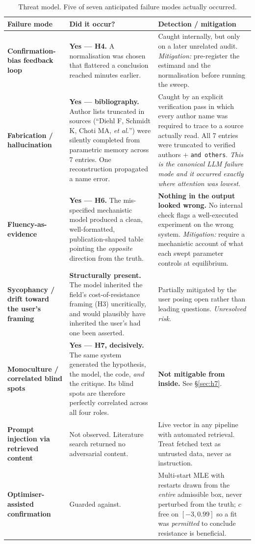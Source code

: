 \documentclass[11pt,a4paper]{article}
\begin{document}
\begin{table}[h]
\centering
\small
\begin{tabular}{p{3.5cm}p{4.6cm}p{5.6cm}}
\toprule
\textbf{Failure mode} & \textbf{Did it occur?} & \textbf{Detection / mitigation}\\
\midrule
\textbf{Confirmation-bias feedback loop} & \textbf{Yes --- H4.} A normalisation was chosen that flattered a conclusion reached minutes earlier. & Caught internally, but only on a later unrelated audit. \emph{Mitigation:} pre-register the estimand and the normalisation before running the sweep.\\
\addlinespace
\textbf{Fabrication / hallucination} & \textbf{Yes --- bibliography.} Author lists truncated in sources (``Diehl F, Schmidt K, Choti MA, \emph{et al.}'') were silently completed from parametric memory across 7 entries. One reconstruction propagated a name error. & Caught by an explicit verification pass in which every author name was required to trace to a source actually read. All 7 entries were truncated to verified authors $+$ \texttt{and others}. \emph{This is the canonical LLM failure mode and it occurred exactly where attention was lowest.}\\
\addlinespace
\textbf{Fluency-as-evidence} & \textbf{Yes --- H6.} The mis-specified mechanistic model produced a clean, well-formatted, publication-shaped table pointing the \emph{opposite} direction from the truth. & \textbf{Nothing in the output looked wrong.} No internal check flags a well-executed experiment on the wrong system. \emph{Mitigation:} require a mechanistic account of what each swept parameter controls at equilibrium.\\
\addlinespace
\textbf{Sycophancy / drift toward the user's framing} & \textbf{Structurally present.} The model inherited the field's cost-of-resistance framing (H3) uncritically, and would plausibly have inherited the user's had one been asserted. & Partially mitigated by the user posing open rather than leading questions. \emph{Unresolved risk.}\\
\addlinespace
\textbf{Monoculture / correlated blind spots} & \textbf{Yes --- H7, decisively.} The same system generated the hypothesis, the model, the code, \emph{and} the critique. Its blind spots are therefore perfectly correlated across all four roles. & \textbf{Not mitigable from inside.} See \S\ref{sec:h7}.\\
\addlinespace
\textbf{Prompt injection via retrieved content} & Not observed. Literature search returned no adversarial content. & Live vector in any pipeline with automated retrieval. Treat fetched text as untrusted data, never as instruction.\\
\addlinespace
\textbf{Optimiser-assisted confirmation} & Guarded against. & Multi-start MLE with restarts drawn from the \emph{entire} admissible box, never perturbed from the truth; $c$ free on $[-3, 0.99]$ so a fit was \emph{permitted} to conclude resistance is beneficial.\\
\bottomrule
\end{tabular}
\caption{Threat model. Five of seven anticipated failure modes actually occurred.}
\end{table}
\end{document}
